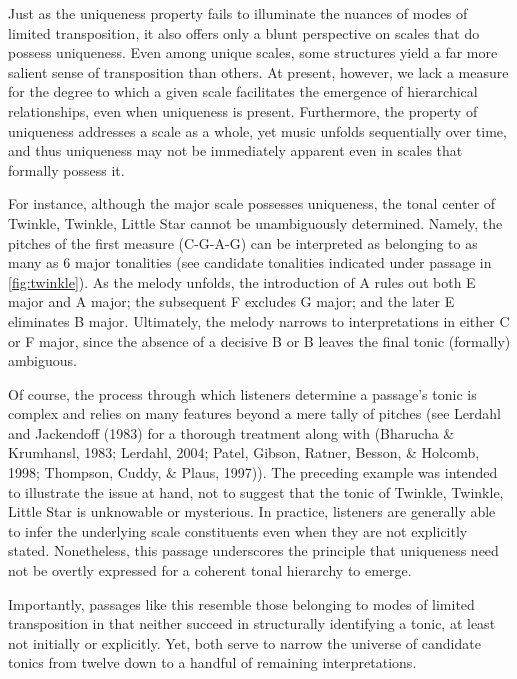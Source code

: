 \documentclass[10pt,twocolumn]{article}
\numberwithin{equation}{section} %
\begin{document}
    Just as the uniqueness property fails to illuminate the nuances of modes of limited transposition, it also offers only a blunt perspective on scales that do possess uniqueness.
    Even among unique scales, some structures yield a far more salient sense of transposition than others.
    At present, however, we lack a measure for the degree to which a given scale facilitates the emergence of hierarchical relationships, even when uniqueness is present.
    Furthermore, the property of uniqueness addresses a scale as a whole, yet music unfolds sequentially over time, and thus uniqueness may not be immediately apparent even in scales that formally possess it.

    For instance, although the major scale possesses uniqueness, the tonal center of Twinkle, Twinkle, Little Star cannot be unambiguously determined.
    Namely, the pitches of the first measure (C-G-A-G) can be interpreted as belonging to as many as 6 major tonalities (see candidate tonalities indicated under passage in \autoref{fig:twinkle}).
    As the melody unfolds, the introduction of A\text{$\natural$} rules out both E\text{$\flat$} major and A\text{$\flat$} major; the subsequent F\text{$\natural$} excludes G major; and the later E\text{$\natural$} eliminates B\text{$\flat$} major.
    Ultimately, the melody narrows to interpretations in either C or F major, since the absence of a decisive B\text{$\natural$} or B\text{$\flat$} leaves the final tonic (formally) ambiguous.

    Of course, the process through which listeners determine a passage's tonic is complex and relies on many features beyond a mere tally of pitches (see Lerdahl and Jackendoff (1983) for a thorough treatment along with (Bharucha \& Krumhansl, 1983; Lerdahl, 2004; Patel, Gibson, Ratner, Besson, \& Holcomb, 1998; Thompson, Cuddy, \& Plaus, 1997)).
    The preceding example was intended to illustrate the issue at hand, not to suggest that the tonic of Twinkle, Twinkle, Little Star is unknowable or mysterious.
    In practice, listeners are generally able to infer the underlying scale constituents even when they are not explicitly stated.
    Nonetheless, this passage underscores the principle that uniqueness need not be overtly expressed for a coherent tonal hierarchy to emerge.

    Importantly, passages like this resemble those belonging to modes of limited transposition in that neither succeed in structurally identifying a tonic, at least not initially or explicitly.
    Yet, both serve to narrow the universe of candidate tonics from twelve down to a handful of remaining interpretations.
\end{document}
